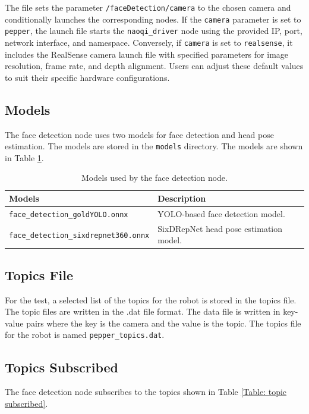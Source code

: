 \documentclass{CSSRforAfrica}
\begin{document}
{The file sets the parameter \texttt{/faceDetection/camera} to the chosen camera and conditionally launches the corresponding nodes. If the \texttt{camera} parameter is set to \texttt{pepper}, the launch file starts the \texttt{naoqi\_driver} node using the provided IP, port, network interface, and namespace. Conversely, if \texttt{camera} is set to \texttt{realsense}, it includes the RealSense camera launch file with specified parameters for image resolution, frame rate, and depth alignment. Users can adjust these default values to suit their specific hardware configurations.

\subsection*{Models}
The face detection node uses two models for face detection and head pose estimation. The models are stored in the \texttt{models} directory. The models are shown in Table \ref{Table: Models for face detection node}.
\begin{table}[h!]
	\centering
	\begin{tabularx}{\linewidth}{| l | X |}
		\hline
		\rowcolor{blue!20} %
		\textbf{Models} & \textbf{Description} \\
		\hline
		{\footnotesize \texttt{face\_detection\_goldYOLO.onnx} }  & {\footnotesize YOLO-based face detection model.} \\
		\hline
		{\footnotesize \texttt{face\_detection\_sixdrepnet360.onnx} }  & {\footnotesize SixDRepNet head pose estimation model.} \\
		\hline
	\end{tabularx}
	\caption{Models used by the face detection node.}
	\label{Table: Models for face detection node}
\end{table}

\subsection*{Topics File} 
For the test, a selected list of the topics for the robot is stored in the topics file. The topic files are 
written in the .dat file format. The data file is written in key-value pairs where the key is the camera 
and the value is the topic. The topics file for the robot is named \texttt{pepper\_topics.dat}.

\newpage
\subsection*{Topics Subscribed}
The face detection node subscribes to the topics shown in Table \ref{Table: topic subscribed}.

}
\end{document}
